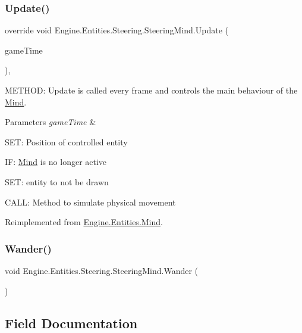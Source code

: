 \subsubsection{\texorpdfstring{Update()}{Update()}}
{\footnotesize\ttfamily override void Engine.\+Entities.\+Steering.\+Steering\+Mind.\+Update (\begin{DoxyParamCaption}\item[{Game\+Time}]{game\+Time }\end{DoxyParamCaption})\hspace{0.3cm}{\ttfamily [inline]}, {\ttfamily [virtual]}}



M\+E\+T\+H\+OD\+: Update is called every frame and controls the main behaviour of the \hyperlink{a00318}{Mind}. 


\begin{DoxyParams}{Parameters}
{\em game\+Time} & \\
\hline
\end{DoxyParams}
S\+ET\+: Position of controlled entity

IF\+: \hyperlink{a00318}{Mind} is no longer active

S\+ET\+: entity to not be drawn

C\+A\+LL\+: Method to simulate physical movement 

Reimplemented from \hyperlink{a00318_adec6999d87accf7371de1536eac2541b}{Engine.\+Entities.\+Mind}.

\mbox{\label{a00346_a953d98dcd5ed2452a71e3658ecd5cf98}} 
\subsubsection{\texorpdfstring{Wander()}{Wander()}}
{\footnotesize\ttfamily void Engine.\+Entities.\+Steering.\+Steering\+Mind.\+Wander (\begin{DoxyParamCaption}{ }\end{DoxyParamCaption})\hspace{0.3cm}{\ttfamily [inline]}}



\subsection{Field Documentation}
\mbox{\label{a00346_ab7696a602bd19d445ee35f6df2572fcb}} 
